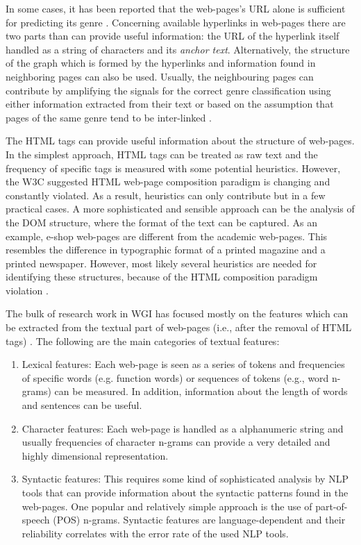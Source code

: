 \begin{itemize}
In some cases, it has been reported that the web-pages's URL alone is sufficient for predicting its genre \parencite{abramson2012_URL,jebari2014pureURL,priyatam2013don_URL,zhu2011enhance}. Concerning available hyperlinks in web-pages there are two parts than can provide useful information: the URL of the hyperlink itself handled as a string of characters and its \textit{anchor text}. Alternatively, the structure of the graph which is formed by the hyperlinks and information found in neighboring pages can also be used. Usually, the neighbouring pages can contribute by amplifying the signals for the correct genre classification using either information extracted from their text or based on the assumption that pages of the same genre tend to be inter-linked \parencite{abramson2012_URL,asheghi2014semi,jebari2014pureURL,priyatam2013don_URL,zhu2011enhance}.

The HTML tags can provide useful information about the structure of web-pages. In the simplest approach, HTML tags can be treated as raw text and the frequency of specific tags is measured with some potential heuristics. However, the W3C suggested HTML web-page composition paradigm is changing and constantly violated. As a result, heuristics can only contribute but in a few practical cases. A more sophisticated and sensible approach can be the analysis of the DOM structure, where the format of the text can be captured. As an example, e-shop web-pages are different from the academic web-pages. This resembles the difference in typographic format of a printed magazine and a printed newspaper. However, most likely several heuristics are needed for identifying these structures, because of the HTML composition paradigm violation \parencite{mehler2011integrating}.

The bulk of research work in WGI has focused mostly on the features which can be extracted from the textual part of web-pages (i.e., after the removal of HTML tags) \parencite{mason2009classifying,sharoff2010web,Sharroff2010,Nooralahzadeh2014,onan2018ensemble}. The following are the main categories of textual features: 

\begin{enumerate}
\item Lexical features: Each web-page is seen as a series of tokens and frequencies of specific words (e.g. function words) or sequences of tokens (e.g., word n-grams) can be measured. In addition, information about the length of words and sentences can be useful.
\item Character features: Each web-page is handled as a alphanumeric string and usually frequencies of character n-grams can provide a very detailed and highly dimensional representation. 
\item Syntactic features: This requires some kind of sophisticated analysis by NLP tools that can provide information about the syntactic patterns found in the web-pages. One popular and relatively simple approach is the use of part-of-speech (POS) n-grams. Syntactic features are language-dependent and their reliability correlates with the error rate of the used NLP tools.
\end{enumerate}


\end{itemize}
